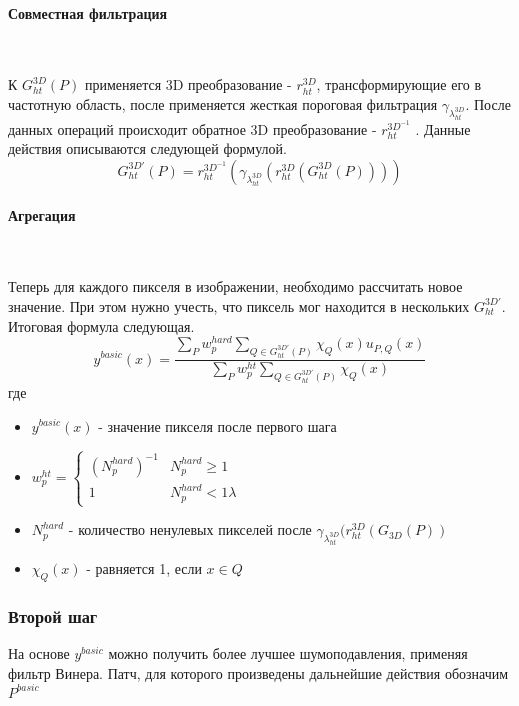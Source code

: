 \paragraph{Совместная фильтрация}\

К $G_{ht}^{3D}(P)$ применяется 3D преобразование - $r_{ht}^{3D}$, трансформирующие его в частотную область, после применяется жесткая пороговая фильтрация $\gamma_{\lambda_{ht}^{3D}}$. После данных операций происходит обратное 3D преобразование - $r_{ht}^{3D^{-1}}$ . Данные действия описываются следующей формулой.
\begin{equation}
G_{ht}^{3D'}(P) = r_{ht}^{3D^{-1}}(\gamma_{\lambda_{ht}^{3D}}(r_{ht}^{3D}(G_{ht}^{3D}(P))))
\end{equation}

\paragraph{Агрегация}\

Теперь для каждого пикселя в изображении, необходимо рассчитать новое значение. При этом нужно учесть, что пиксель мог находится в нескольких $G_{ht}^{3D'}$. Итоговая формула следующая.
\begin{equation}
	y^{basic}(x) = \frac{\sum\limits_Pw_p^{hard}\sum\limits_{Q \in G_{ht}^{3D'}(P)}\chi_Q(x)u_{P,Q}(x)}{\sum\limits_Pw_p^{ht}\sum\limits_{Q \in G_{ht}^{3D'}(P)}\chi_Q(x)}
\end{equation}
где
\begin{itemize}
	\item $y^{basic}(x)$ - значение пикселя после первого шага 
	\item $w_p^{ht}  = \begin{cases}(N_p^{hard})^{-1} & N_p^{hard} \geq 1\\ 1 & N_p^{hard} < 1 \lambda\end{cases}$
	\item $N_p^{hard}$ - количество ненулевых пикселей после $\gamma_{\lambda_{ht}^{3D}}(r_{ht}^{3D}(G_{3D}(P))$
	\item $\chi_Q(x)$ - равняется 1, если $x\in Q$
\end{itemize}

\subsubsection{Второй шаг}
На основе $y^{basic}$ можно получить более лучшее шумоподавления, применяя фильтр Винера. Патч, для которого произведены дальнейшие действия обозначим $P^{basic}$
